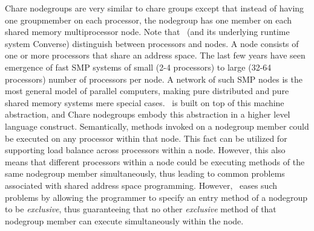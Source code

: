 Chare nodegroups are very similar to chare groups except that instead of having
one groupmember on each processor, the nodegroup has one member on each shared
memory multiprocessor node. Note that \charmpp\ (and its underlying runtime
system Converse) distinguish between processors and nodes. A node consists of
one or more processors that share an address space. The last few years have
seen emergence of fast SMP systems of small (2-4 processors) to large (32-64
processors) number of processors per node. A network of such SMP nodes is the
most general model of parallel computers, making pure distributed and pure
shared memory systems mere special cases. \charmpp\ is built on top of this
machine abstraction, and Chare nodegroups embody this abstraction in a higher
level language construct. Semantically, methods invoked on a nodegroup member
could be executed on any processor within that node. This fact can be utilized
for supporting load balance across processors within a node. However, this also
means that different processors within a node could be executing methods of the
same nodegroup member simultaneously, thus leading to common problems
associated with shared address space programming. However, \charmpp\ eases such
problems by allowing the programmer to specify an entry method of a nodegroup
to be {\em exclusive}, thus guaranteeing that no other {\em exclusive} method
of that nodegroup member can execute simultaneously within the node.

